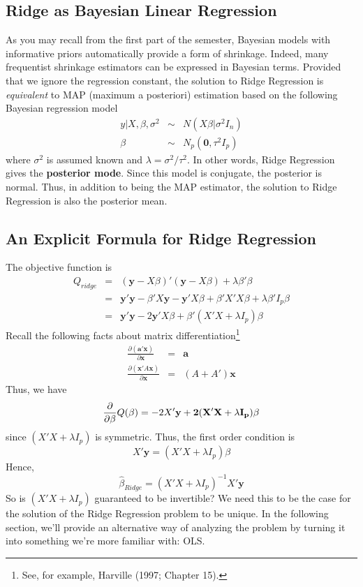 \documentclass[12pt]{article}
\theoremstyle{definition}
\begin{document}
\subsection{Ridge as Bayesian Linear Regression}
As you may recall from the first part of the semester, Bayesian models with informative priors automatically provide a form of shrinkage. Indeed, many frequentist shrinkage estimators can be expressed in Bayesian terms. Provided that we ignore the regression constant, the solution to Ridge Regression is \emph{equivalent} to MAP (maximum a posteriori) estimation based on the following  Bayesian regression model
	\begin{eqnarray*}
		y|X, \beta, \sigma^2 &\sim& N(X\beta|\sigma^2 I_n) \\
		\beta &\sim& N_p(\mathbf{0}, \tau^2 I_p)
	\end{eqnarray*}
where $\sigma^2$ is assumed known and $\lambda = \sigma^2/\tau^2$. In other words, Ridge Regression gives the \textbf{posterior mode}. Since this model is conjugate, the posterior is normal. Thus, in addition to being the MAP estimator, the solution to Ridge Regression is also the posterior mean.


\subsection{An Explicit Formula for Ridge Regression}
The objective function is
\begin{eqnarray*}
	Q_{ridge}&=& (\mathbf{y} - X\beta)' (\mathbf{y} - X\beta) + \lambda \beta'\beta\\
	&=&\mathbf{y}'\mathbf{y} - \beta'X \mathbf{y} - \mathbf{y}'X\beta + \beta'X'X \beta + \lambda \beta' I_p \beta\\
	&=& \mathbf{y}'\mathbf{y} - 2 \mathbf{y}'X\beta + \beta'(X'X + \lambda I_p)\beta
\end{eqnarray*}
Recall the following facts about matrix differentiation\footnote{See, for example, Harville (1997; Chapter 15).}
	\begin{eqnarray*}
		\frac{\partial (\mathbf{a}' \mathbf{x})}{\partial \mathbf{x}}  &=& \mathbf{a}\\
		\frac{\partial( \mathbf{x}'A \mathbf{x})}{\partial \mathbf{x}} &=& (A + A')\mathbf{x}
	\end{eqnarray*}
Thus, we have 
$$\frac{\partial}{\partial \beta} Q(\beta) = -2X'\bf{y} + 2(X'X + \lambda I_p)\beta$$
since $(X'X + \lambda I_p)$ is symmetric. Thus, the first order condition is 
	$$X'\textbf{y} = (X'X + \lambda I_p)\beta$$
Hence,
	$$\widehat{\beta}_{Ridge} = (X'X + \lambda I_p)^{-1} X'\textbf{y}$$
So is $(X'X + \lambda I_p)$ guaranteed to be invertible? We need this to be the case for the solution of the Ridge Regression problem to be unique. In the following section, we'll provide an alternative way of analyzing the problem by turning it into something we're more familiar with: OLS.
\end{document}
